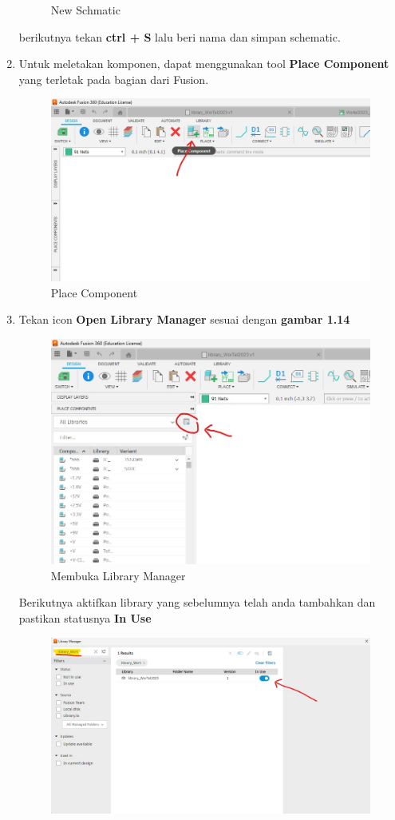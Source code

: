 \begin{enumerate}
\begin{figure}[H]
            \caption{New Schmatic} 
            \label{fig:New Schematic}
        \end{figure}
    berikutnya tekan \textbf{ctrl + S} lalu beri nama dan simpan schematic.
    \item Untuk meletakan komponen, dapat menggunakan tool \textbf{Place Component} yang terletak pada bagian dari Fusion.
        \begin{figure}[H]
            \centering
            \includegraphics[width=0.6\linewidth]{P1/img/gambar13.jpeg}
            \caption{Place Component} 
            \label{fig:Place Component}
        \end{figure}
    \item Tekan icon \textbf{Open Library Manager} sesuai dengan \textbf{gambar 1.14}
        \begin{figure}[H]
            \centering
            \includegraphics[width=0.6\linewidth]{P1/img/gambar14.jpeg}
            \caption{Membuka Library Manager} 
            \label{fig:Membuka LIbrary Manager}
        \end{figure}
    Berikutnya aktifkan library yang sebelumnya telah anda tambahkan dan pastikan statusnya \textbf{In Use}
        \begin{figure}[H]
            \centering
            \includegraphics[width=0.6\linewidth]{P1/img/gambar15.jpeg}

\end{figure}
\end{enumerate}
